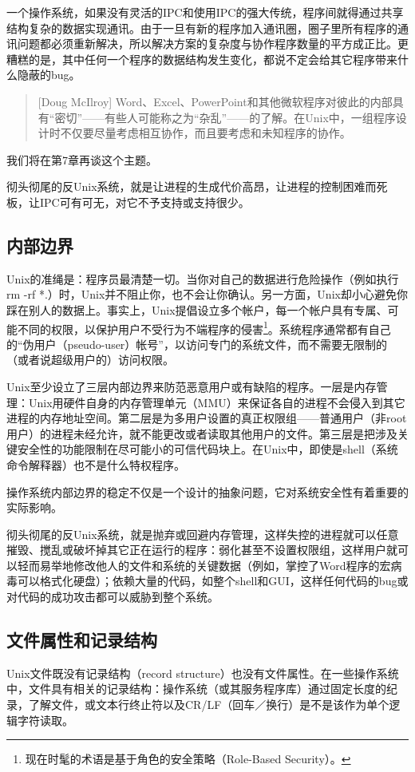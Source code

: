 \documentclass[12pt,oneside]{book}
\begin{document}
\begin{common-format}
一个操作系统，如果没有灵活的IPC和使用IPC的强大传统，程序间就得通过共享结构复杂的数据实现通讯。由于一旦有新的程序加入通讯圈，圈子里所有程序的通讯问题都必须重新解决，所以解决方案的复杂度与协作程序数量的平方成正比。更糟糕的是，其中任何一个程序的数据结构发生变化，都说不定会给其它程序带来什么隐蔽的bug。

\begin{quote}[Doug McIlroy]
Word、Excel、PowerPoint和其他微软程序对彼此的内部具有“密切”——有些人可能称之为“杂乱”——的了解。在Unix中，一组程序设计时不仅要尽量考虑相互协作，而且要考虑和未知程序的协作。
\end{quote}

我们将在第7章再谈这个主题。

彻头彻尾的反Unix系统，就是让进程的生成代价高昂，让进程的控制困难而死板，让IPC可有可无，对它不予支持或支持很少。

\subsection{内部边界}
Unix的准绳是：程序员最清楚一切。当你对自己的数据进行危险操作（例如执行rm -rf *.）时，Unix并不阻止你，也不会让你确认。另一方面，Unix却小心避免你踩在别人的数据上。事实上，Unix提倡设立多个帐户，每一个帐户具有专属、可能不同的权限，以保护用户不受行为不端程序的侵害\footnote{现在时髦的术语是基于角色的安全策略（Role-Based Security）。}。系统程序通常都有自己的“伪用户（pseudo-user）帐号”，以访问专门的系统文件，而不需要无限制的（或者说超级用户的）访问权限。

Unix至少设立了三层内部边界来防范恶意用户或有缺陷的程序。一层是内存管理：Unix用硬件自身的内存管理单元（MMU）来保证各自的进程不会侵入到其它进程的内存地址空间。第二层是为多用户设置的真正权限组——普通用户（非root用户）的进程未经允许，就不能更改或者读取其他用户的文件。第三层是把涉及关键安全性的功能限制在尽可能小的可信代码块上。在Unix中，即使是shell（系统命令解释器）也不是什么特权程序。

操作系统内部边界的稳定不仅是一个设计的抽象问题，它对系统安全性有着重要的实际影响。

彻头彻尾的反Unix系统，就是抛弃或回避内存管理，这样失控的进程就可以任意摧毁、搅乱或破坏掉其它正在运行的程序：弱化甚至不设置权限组，这样用户就可以轻而易举地修改他人的文件和系统的关键数据（例如，掌控了Word程序的宏病毒可以格式化硬盘）；依赖大量的代码，如整个shell和GUI，这样任何代码的bug或对代码的成功攻击都可以威胁到整个系统。

\subsection{文件属性和记录结构}
Unix文件既没有记录结构（record structure）也没有文件属性。在一些操作系统中，文件具有相关的记录结构：操作系统（或其服务程序库）通过固定长度的纪录，了解文件，或文本行终止符以及CR/LF（回车／换行）是不是该作为单个逻辑字符读取。


\end{common-format}
\end{document}
